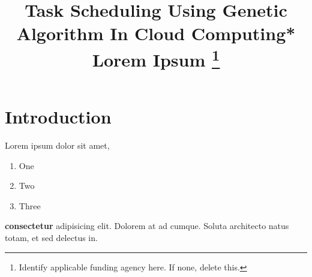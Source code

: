 \documentclass[stu,12pt,floatsintext]{apa7}%
\begin{document}
%
\normalsize%
\title{Task Scheduling Using Genetic Algorithm In Cloud Computing*\\
{\footnotesize Lorem Ipsum}
\thanks{Identify applicable funding agency here. If none, delete this.}
}%
\author{
}%
\maketitle%
\section{Introduction}%
\label{sec:Introduction}%
Lorem ipsum dolor sit amet, \begin{enumerate}\item One\item Two\item Three\end{enumerate} \textbf{consectetur} adipisicing elit. Dolorem at ad cumque. Soluta architecto natus totam, \cite{Sample2024} et sed delectus in.

%
\end{document}
